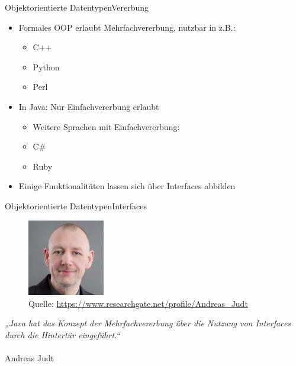 
\begin{frame}{Objektorientierte Datentypen}{Vererbung}
    \begin{itemize}
        \item Formales OOP erlaubt Mehrfachvererbung, nutzbar in z.B.:
        \begin{itemize}
            \item C++
            \item Python
            \item Perl
        \end{itemize}
        \item In Java: Nur Einfachvererbung erlaubt
        \begin{itemize}
            \item Weitere Sprachen mit Einfachvererbung:
            \item C\#
            \item Ruby
        \end{itemize}
        \item Einige Funktionalitäten lassen sich über Interfaces abbilden
    \end{itemize}
\end{frame}

\begin{frame}{Objektorientierte Datentypen}{Interfaces}
    \begin{minipage}{0.4\textwidth}
            \begin{figure}
                \includegraphics[height=3.35cm]{graph/judt}
                \caption*{Quelle: \url{https://www.researchgate.net/profile/Andreas_Judt}}
                \label{fig:ll}
            \end{figure}
        \end{minipage}
        \hfill
        \begin{minipage}{0.55\textwidth}
            \textit{„Java hat das Konzept der Mehrfachvererbung über die Nutzung von Interfaces durch die Hintertür eingeführt.“} \\\\Andreas Judt
        \end{minipage}
\end{frame}

